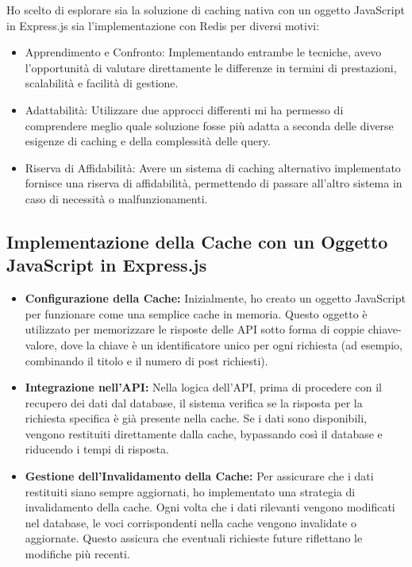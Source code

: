 \documentclass[12pt]{article}
\begin{document}
Ho scelto di esplorare sia la soluzione di caching nativa con un oggetto JavaScript in Express.js sia l'implementazione con Redis per diversi motivi:
\begin{itemize}
\item Apprendimento e Confronto: Implementando entrambe le tecniche, avevo l'opportunità di valutare direttamente le differenze in termini di prestazioni, scalabilità e facilità di gestione.
\item Adattabilità: Utilizzare due approcci differenti mi ha permesso di comprendere meglio quale soluzione fosse più adatta a seconda delle diverse esigenze di caching e della complessità delle query.
\item Riserva di Affidabilità: Avere un sistema di caching alternativo implementato fornisce una riserva di affidabilità, permettendo di passare all'altro sistema in caso di necessità o malfunzionamenti.
\end{itemize}

\subsection{Implementazione della Cache con un Oggetto JavaScript in Express.js}

\begin{itemize}

\item \textbf{Configurazione della Cache:} Inizialmente, ho creato un oggetto JavaScript per funzionare come una semplice cache in memoria. Questo oggetto è utilizzato per memorizzare le risposte delle API sotto forma di coppie chiave-valore, dove la chiave è un identificatore unico per ogni richiesta (ad esempio, combinando il titolo e il numero di post richiesti).
\item \textbf{Integrazione nell'API:}
 Nella logica dell'API, prima di procedere con il recupero dei dati dal database, il sistema verifica se la risposta per la richiesta specifica è già presente nella cache. Se i dati sono disponibili, vengono restituiti direttamente dalla cache, bypassando così il database e riducendo i tempi di risposta.
 \item \textbf{Gestione dell'Invalidamento della Cache: }
Per assicurare che i dati restituiti siano sempre aggiornati, ho implementato una strategia di invalidamento della cache. Ogni volta che i dati rilevanti vengono modificati nel database, le voci corrispondenti nella cache vengono invalidate o aggiornate. Questo assicura che eventuali richieste future riflettano le modifiche più recenti.

\end{itemize}
\end{document}
